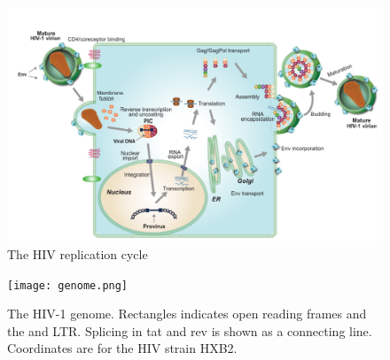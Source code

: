 \documentclass[../sherrill-Mix_thesis.tex]{subfiles}
\begin{document}
	\begin{figure}
		\centering
		\includegraphics[width=\textwidth]{lifecycle.pdf} %
		\caption[The HIV replication cycle]{The HIV replication cycle} %
		\label{figHIVLifecycle}
	\end{figure}

	\begin{figure}
		\centering
		\texttt{[image: genome.png]} %
		\caption[The HIV-1 genome]{The HIV-1 genome. Rectangles indicates open reading frames and the \fivePrime{} and \threePrime{} LTR. Splicing in tat and rev is shown as a connecting line. Coordinates are for the HIV strain HXB2.}
		\label{figHIVGenome}
	\end{figure}
\end{document}
